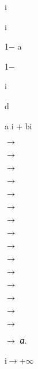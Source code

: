 \documentclass[a4paper,portrait,12pt]{article}
\begin{document}
\begin{flushleft}
i
\end{flushleft}





\begin{flushleft}
i
\end{flushleft}





\begin{flushleft}
1$-$ a
\end{flushleft}


1$-$





\begin{flushleft}
i
\end{flushleft}


\begin{flushleft}
d
\end{flushleft}


\begin{flushleft}
a i + bi
\end{flushleft}





$\rightarrow$


$\rightarrow$


$\rightarrow$


$\rightarrow$


$\rightarrow$


$\rightarrow$


$\rightarrow$


$\rightarrow$


$\rightarrow$


$\rightarrow$


$\rightarrow$


$\rightarrow$


$\rightarrow$


$\rightarrow$


$\rightarrow$


\begin{flushleft}
$\rightarrow$ 𝛼.
\end{flushleft}


\begin{flushleft}
i$\rightarrow$+$\infty$
\end{flushleft}
\end{document}
